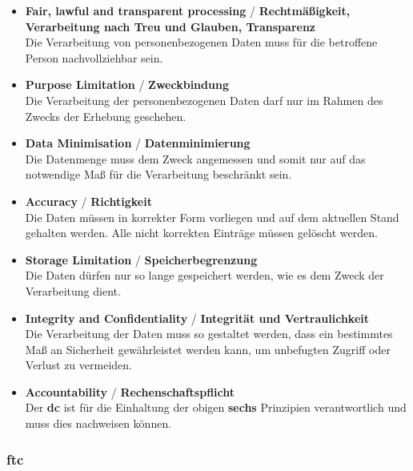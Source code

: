 \begin{itemize}
\item \textbf{Fair, lawful and transparent processing} / \textbf{Rechtmäßigkeit, Verarbeitung nach Treu und Glauben, Transparenz} \\ Die Verarbeitung von personenbezogenen Daten muss für die betroffene Person nachvollziehbar sein.
\item \textbf{Purpose Limitation} / \textbf{Zweckbindung} \\ Die Verarbeitung der personenbezogenen Daten darf nur im Rahmen des Zwecks der Erhebung geschehen.
\item \textbf{Data Minimisation} / \textbf{Datenminimierung} \\ Die Datenmenge muss dem Zweck angemessen und somit nur auf das notwendige Maß für die Verarbeitung beschränkt sein.
\item \textbf{Accuracy} / \textbf{Richtigkeit} \\ Die Daten müssen in korrekter Form vorliegen und auf dem aktuellen Stand gehalten werden. Alle nicht korrekten Einträge müssen gelöscht werden.
\item \textbf{Storage Limitation} / \textbf{Speicherbegrenzung} \\ Die Daten dürfen nur so lange gespeichert werden, wie es dem Zweck der Verarbeitung dient.
\item \textbf{Integrity and Confidentiality} / \textbf{Integrität und Vertraulichkeit} \\ Die Verarbeitung der Daten muss so gestaltet werden, dass ein bestimmtes Maß an Sicherheit gewährleistet werden kann, um unbefugten Zugriff oder Verlust zu vermeiden.
\item \textbf{Accountability} / \textbf{Rechenschaftspflicht} \\ Der \textbf{\ac{dc}} ist für die Einhaltung der obigen \textbf{sechs} Prinzipien verantwortlich und muss dies nachweisen können.
\end{itemize}

\subsubsection{\acl{ftc}}
\label{sec:Grundlagen:ssec:Rechtliche Rahmenbedingungen:sssec:FTC}


